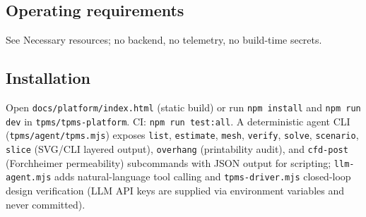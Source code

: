 \documentclass[5p,times,authoryear]{elsarticle}
\begin{document}
\subsection{Operating requirements}
See Necessary resources; no backend, no telemetry, no build-time secrets.

\subsection{Installation}
Open \texttt{docs/platform/index.html} (static build) or run \texttt{npm install} and
\texttt{npm run dev} in \texttt{tpms/tpms-platform}. CI: \texttt{npm run test:all}.
A deterministic agent CLI (\texttt{tpms/agent/tpms.mjs}) exposes \texttt{list},
\texttt{estimate}, \texttt{mesh}, \texttt{verify}, \texttt{solve}, \texttt{scenario},
\texttt{slice} (SVG/CLI layered output), \texttt{overhang} (printability audit), and
\texttt{cfd-post} (Forchheimer permeability) subcommands with JSON output for scripting;
\texttt{llm-agent.mjs} adds natural-language tool calling and \texttt{tpms-driver.mjs}
closed-loop design verification (LLM API keys are supplied via environment variables and
never committed).
\end{document}
